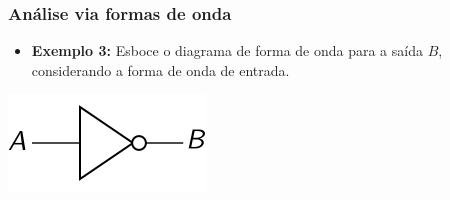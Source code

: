 \documentclass{beamer}
\begin{document}

\begin{frame}
\frametitle{Análise via formas de onda}

\begin{itemize}
\item \textbf{Exemplo 3:} Esboce o diagrama de forma de onda para a saída
$B$, considerando a forma de onda de entrada.
\end{itemize}
\begin{center}
\includegraphics{images/waveform2_circ}\\[12pt]
%
%
%

\end{center}
\end{frame}
\end{document}
